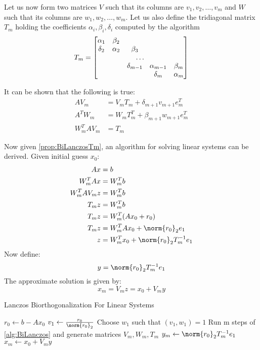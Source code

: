 Let us now form two matrices $V$ such that its columns are $v_1, v_2, \dots, v_m$ and $W$ such that its columns are $w_1, w_2, \dots, w_m$. Let us also define the tridiagonal matrix $T_m$ holding the coefficients $\alpha_i, \beta_i, \delta_i$ computed by the algorithm
\begin{equation*}
	T_m = \begin{bmatrix}
	\alpha_1 & \beta_2 & & &\\
	\delta_2 & \alpha_2 & \beta_3 & & \\
	\multicolumn{5}{c}{\dots}     \\
	& & \delta_{m-1} & \alpha_{m-1} & \beta_m \\
	& & & \delta_m & \alpha_m
	\end{bmatrix}
\end{equation*}
\begin{proposition}\label{prop:BiLanczosTm}
It can be shown \cite{saad-sparse} that the following is true:
	\begin{align}
		AV_m &= V_mT_m + \delta_{m+1}v_{m+1}e^T_m \\
		A^TW_m &= W_mT^T_m + \beta_{m+1}w_{m+1}e^T_m \\
		W^T_mAV_m &= T_m
	\end{align}
\end{proposition}
Now given \cref{prop:BiLanczosTm}, an algorithm for solving linear systems can be derived. Given initial guess $x_0$:
\begin{align*}
	Ax &= b \\
	W^T_mAx &= W^T_mb \\
	W^T_mAV_mz &= W^T_mb \\
	T_mz &= W^T_mb \\
	T_mz &= W^T_m(Ax_0 + r_0) \\
	T_mz &= W^T_mAx_0 + \norm{r_0}_2e_1 \\
	z &= W^T_mx_0 + \norm{r_0}_2 T^{-1}_m e_1	
\end{align*}
Now define:
\begin{equation}
	y = \norm{r_0}_2 T^{-1}_m e_1
\end{equation}
The approximate solution is given by:
\begin{equation}
	x_m = V_mz = x_0 + V_my
\end{equation}

\begin{algorithm}[H]
 \centering
 \caption{Lanczos Biorthogonalization For Linear Systems}\label{alg:BiLanczosLinearSystem}
 \begin{algorithmic}[1]
			\State $r_0 \gets b - Ax_0$
			\State $v_1 \gets \frac{r_0}{\norm{r_0}_2}$
			\State Choose $w_1$ such that $(v_1, w_1) = 1$
			\State Run m steps of \cref{alg:BiLanczos} and generate matrices $V_m, W_m, T_m$
			\State $y_m \gets \norm{r_0}_2T^{-1}_me_1$
			\State $x_m \gets x_0 + V_my$
		\EndProcedure
 \end{algorithmic}
\end{algorithm}

